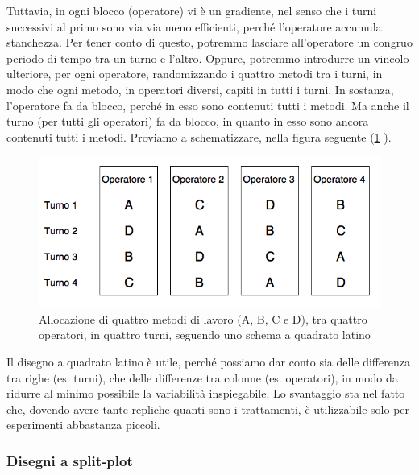\documentclass[a4paper,12pt,oneside]{book}
\begin{document}
Tuttavia, in ogni blocco (operatore) vi è un gradiente, nel senso che i turni successivi al primo sono via via meno efficienti, perché l'operatore accumula stanchezza. Per tener conto di questo, potremmo lasciare all'operatore un congruo periodo di tempo tra un turno e l'altro. Oppure, potremmo introdurre un vincolo ulteriore, per ogni operatore, randomizzando i quattro metodi tra i turni, in modo che ogni metodo, in operatori diversi, capiti in tutti i turni. In sostanza, l'operatore fa da blocco, perché in esso sono contenuti tutti i metodi. Ma anche il turno (per tutti gli operatori) fa da blocco, in quanto in esso sono ancora contenuti tutti i metodi. Proviamo a schematizzare, nella figura seguente (\ref{fig:figName391} ).

\begin{figure}

{\centering \includegraphics[width=0.9\linewidth]{_images/TurniOperatori} 

}

\caption{Allocazione di quattro metodi di lavoro (A, B, C e D), tra quattro operatori, in quattro turni, seguendo uno schema a quadrato latino}\label{fig:figName391}
\end{figure}

Il disegno a quadrato latino è utile, perché possiamo dar conto sia delle differenza tra righe (es. turni), che delle differenze tra colonne (es. operatori), in modo da ridurre al minimo possibile la variabilità inspiegabile. Lo svantaggio sta nel fatto che, dovendo avere tante repliche quanti sono i trattamenti, è utilizzabile solo per esperimenti abbastanza piccoli.

\hypertarget{disegni-a-split-plot}{%
\subsubsection{Disegni a split-plot}\label{disegni-a-split-plot}}
\end{document}
